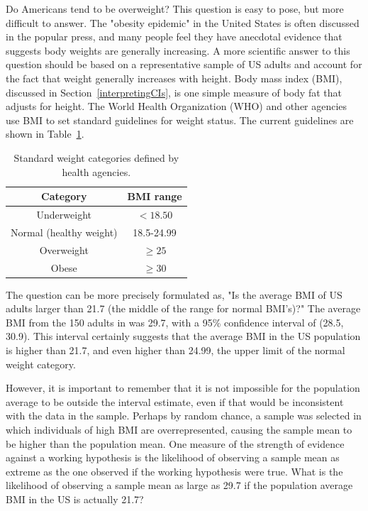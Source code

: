 \begin{spacing}{1.5}

Do Americans tend to be overweight? This question is easy to pose, but more difficult to answer. The "obesity epidemic" in the United States is often discussed in the popular press, and many people feel they have anecdotal evidence that suggests body weights are generally increasing. A more scientific answer to this question should be based on a representative sample of US adults and account for the fact that weight generally increases with height. Body mass index (BMI), discussed in Section~\ref{interpretingCIs}, is one simple measure of body fat that adjusts for height. The World Health Organization (WHO) and other agencies use BMI to set standard guidelines for weight status. The current guidelines are shown in Table~\ref{whoBmiGuidelines}. 


\begin{table}[h!]
\begin{center}
\begin{tabular}{|c|c|}
\hline 
Category & BMI range\tabularnewline
\hline 
\hline 
Underweight & $<18.50$\tabularnewline
\hline 
Normal (healthy weight) & 18.5-24.99\tabularnewline
\hline 
Overweight & $\geq 25$\tabularnewline
\hline 
Obese & $\geq30$\tabularnewline
\hline
\end{tabular}
\caption{Standard weight categories defined by health agencies.} 
\label{whoBmiGuidelines}
\end{center}
\end{table}

The question can be more precisely formulated as, "Is the average BMI of US adults larger than 21.7 (the middle of the range for normal BMI's)?" The average BMI from the 150 adults in  was 29.7, with a 95\% confidence interval of (28.5, 30.9). This interval certainly suggests that the average BMI in the US population is higher than 21.7, and even higher than 24.99, the upper limit of the normal weight category. 

However, it is important to remember that it is not impossible for the population average to be outside the interval estimate, even if that would be inconsistent with the data in the sample. Perhaps by random chance, a sample was selected in which individuals of high BMI are overrepresented, causing the sample mean to be higher than the population mean. One measure of the strength of evidence against a working hypothesis is the likelihood of observing a sample mean as extreme as the one observed if the working hypothesis were true. What is the likelihood of observing a sample mean as large as 29.7 if the population average BMI in the US is actually 21.7?


\end{spacing}
